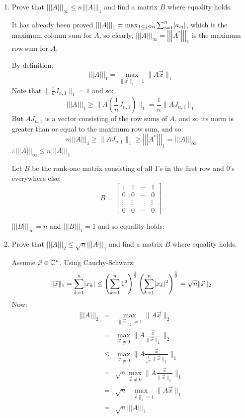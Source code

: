 \documentclass[letterpaper,12pt,fleqn]{article}
\newcommand{\mnorm}[1]{\left|\left|\left|#1\right|\right|\right|}
\newcommand{\norm}[1]{\|#1\|}
\newcommand{\vx}{\vec{x}}
\begin{document}
\begin{enumerate}
\begin{enumerate}
  \item Prove that $\mnorm{A}_{\infty}\le n\mnorm{A}_1$ and find a matrix $B$ where
    equality holds.

    It has already been proved $\mnorm{A}_1=\max_{1\le j\le n}\sum_{i=1}^n\abs{a_{ij}}$,
    which is the maximum column sum for $A$, so clearly,
    $\mnorm{A}_{\infty}=\mnorm{A^*}_1$ is the maximum row sum for $A$.

    By definition:
    \[\mnorm{A}_1=\max_{\norm{\vx}_1=1}\norm{A\vx}_1\]
    Note that $\norm{\frac{1}{n}J_{n,1}}_1=1$ and so:
    \[\mnorm{A}_1\ge\norm{A\left(\frac{1}{n}J_{n,1}\right)}_1=
    \frac{1}{n}\norm{AJ_{n,1}}_1\]
    But $AJ_{n,1}$ is a vector consisting of the row sums of $A$, and so its norm is
    greater than or equal to the maximum row sum, and so:
    \[n\mnorm{A}_1\ge\norm{AJ_{n,1}}_1\ge\mnorm{A^*}_1=\mnorm{A}_{\infty}\]
    $\therefore\mnorm{A}_{\infty}\le n\mnorm{A}_1$

    Let $B$ be the rank-one matrix consisting of all 1's in the first row and
    0's everywhere else:
    \[B=\begin{bmatrix}
    1 & 1 & \cdots & 1 \\
    0 & 0 & \cdots & 0 \\
    \vdots & \vdots & & \vdots \\
    0 & 0 & \cdots & 0
    \end{bmatrix}\]

    $\mnorm{B}_{\infty}=n$ and $\mnorm{B}_1=1$ and so equality holds.

  \item Prove that $\mnorm{A}_2\le\sqrt{n}\mnorm{A}_1$ and find a matrix $B$ where
    equality holds.

    Assume $\vx\in\C^n$. Using Cauchy-Schwarz:
    \[\norm{\vx}_1=\sum_{k=1}^n\abs{x_k}\le
    \left(\sum_{k=1}^n1^2\right)^{\frac{1}{2}}
    \left(\sum_{k=1}^n\abs{x_k}^2\right)^{\frac{1}{2}}=\sqrt{n}\norm{\vx}_2\]
    Now:
    \begin{eqnarray*}
      \mnorm{A}_2 &=& \max_{\norm{\vx}_2=1}\norm{A\vx}_2 \\
      &=& \max_{\vx\ne0}\norm{A\frac{\vx}{\norm{\vx}_2}}_2 \\
      &\le& \max_{\vx\ne0}\norm{A\frac{\vx}{\frac{1}{\sqrt{n}}\norm{\vx}_1}}_1 \\
      &=& \sqrt{n}\max_{\vx\ne0}\norm{A\frac{\vx}{\norm{\vx}_1}}_1 \\
      &=& \sqrt{n}\max_{\norm{\vx}_1=1}\norm{A\vx}_1 \\
      &=& \sqrt{n}\mnorm{A}_1
    \end{eqnarray*}
    

\end{enumerate}
\end{enumerate}
\end{document}
